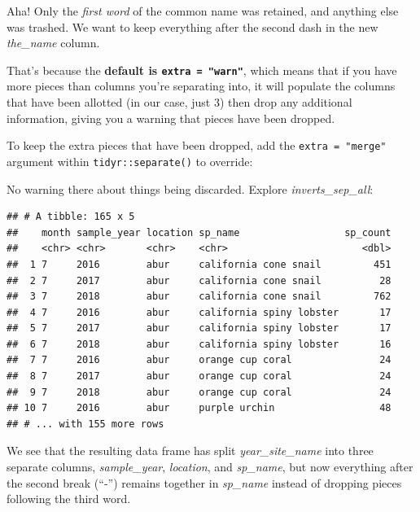 \documentclass[]{book}
\newenvironment{Shaded}{\begin{snugshade}}{\end{snugshade}}
\newcommand{\DataTypeTok}[1]{\textcolor[rgb]{0.13,0.29,0.53}{#1}}
\newcommand{\KeywordTok}[1]{\textcolor[rgb]{0.13,0.29,0.53}{\textbf{#1}}}
\newcommand{\NormalTok}[1]{#1}
\newcommand{\OperatorTok}[1]{\textcolor[rgb]{0.81,0.36,0.00}{\textbf{#1}}}
\newcommand{\StringTok}[1]{\textcolor[rgb]{0.31,0.60,0.02}{#1}}
\begin{document}
Aha! Only the \emph{first word} of the common name was retained, and anything else was trashed. We want to keep everything after the second dash in the new \emph{the\_name} column.

That's because the \textbf{default is \texttt{extra\ =\ "warn"}}, which means that if you have more pieces than columns you're separating into, it will populate the columns that have been allotted (in our case, just 3) then drop any additional information, giving you a warning that pieces have been dropped.

To keep the extra pieces that have been dropped, add the \texttt{extra\ =\ "merge"} argument within \texttt{tidyr::separate()} to override:

\begin{Shaded}
\end{Shaded}

No warning there about things being discarded. Explore \emph{inverts\_sep\_all}:

\begin{verbatim}
## # A tibble: 165 x 5
##    month sample_year location sp_name                  sp_count
##    <chr> <chr>       <chr>    <chr>                       <dbl>
##  1 7     2016        abur     california cone snail         451
##  2 7     2017        abur     california cone snail          28
##  3 7     2018        abur     california cone snail         762
##  4 7     2016        abur     california spiny lobster       17
##  5 7     2017        abur     california spiny lobster       17
##  6 7     2018        abur     california spiny lobster       16
##  7 7     2016        abur     orange cup coral               24
##  8 7     2017        abur     orange cup coral               24
##  9 7     2018        abur     orange cup coral               24
## 10 7     2016        abur     purple urchin                  48
## # ... with 155 more rows
\end{verbatim}

We see that the resulting data frame has split \emph{year\_site\_name} into three separate columns, \emph{sample\_year}, \emph{location}, and \emph{sp\_name}, but now everything after the second break (``-'') remains together in \emph{sp\_name} instead of dropping pieces following the third word.
\end{document}
